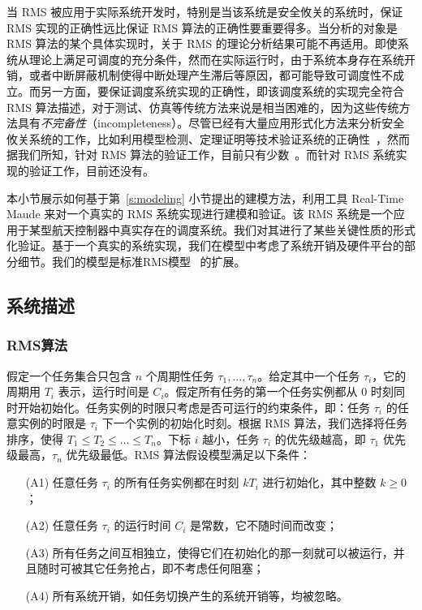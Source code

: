 当 RMS 被应用于实际系统开发时，特别是当该系统是安全攸关的系统时，保证 RMS 实现的正确性远比保证 RMS 算法的正确性要重要得多。当分析的对象是 RMS 算法的某个具体实现时，关于 RMS 的理论分析结果可能不再适用。即使系统从理论上满足可调度的充分条件，然而在实际运行时，由于系统本身存在系统开销，或者中断屏蔽机制使得中断处理产生滞后等原因，都可能导致可调度性不成立。而另一方面，要保证调度系统实现的正确性，即该调度系统的实现完全符合 RMS 算法描述，对于测试、仿真等传统方法来说是相当困难的，因为这些传统方法具有\emph{不完备性}（incompleteness）。尽管已经有大量应用形式化方法来分析安全攸关系统的工作，比如利用模型检测、定理证明等技术验证系统的正确性~\cite{DBLP:journals/tie/JiangZLDSGS15,DBLP:journals/iandc/MeseguerR13,DBLP:journals/cacm/Leroy09,DBLP:conf/sosp/KleinEHACDEEKNSTW09}，然而据我们所知，针对 RMS 算法的验证工作，目前只有少数~\cite{TianD2011,DBLP:conf/iceccs/CuiDT14}。而针对 RMS 系统实现的验证工作，目前还没有。

本小节展示如何基于第~\ref{s:modeling} 小节提出的建模方法，利用工具 Real-Time Maude 来对一个真实的 RMS 系统实现进行建模和验证。该 RMS 系统是一个应用于某型航天控制器中真实存在的调度系统。我们对其进行了某些关键性质的形式化验证。基于一个真实的系统实现，我们在模型中考虑了系统开销及硬件平台的部分细节。我们的模型是标准RMS模型~\cite{DBLP:journals/jacm/LiuL73} 的扩展。

\subsection{系统描述}
\label{s:background}

\subsubsection{RMS算法}
\label{ss:rms}

假定一个任务集合只包含 $n$ 个周期性任务 $\tau_1,\ldots,\tau_n$。给定其中一个任务 $\tau_i$，它的周期用 $T_i$ 表示，运行时间是 $C_i$。假定所有任务的第一个任务实例都从 $0$ 时刻同时开始初始化。任务实例的时限只考虑是否可运行的约束条件，即：任务 $\tau_i$ 的任意实例的时限是 $\tau_i$ 下一个实例的初始化时刻。根据 RMS 算法，我们选择将任务排序，使得 $T_1\le T_2\le \ldots \le T_n$。下标 $i$ 越小，任务 $\tau_i$ 的优先级越高，即 $\tau_1$ 优先级最高，$\tau_n$ 优先级最低。RMS 算法假设模型满足以下条件：
\begin{enumerate}
\item [(A1)] 任意任务 $\tau_i$ 的所有任务实例都在时刻 $kT_i$ 进行初始化，其中整数 $k\ge 0$；
\item [(A2)] 任意任务 $\tau_i$ 的运行时间 $C_i$ 是常数，它不随时间而改变；
\item [(A3)] 所有任务之间互相独立，使得它们在初始化的那一刻就可以被运行，并且随时可被其它任务抢占，即不考虑任何阻塞；
\item [(A4)] 所有系统开销，如任务切换产生的系统开销等，均被忽略。
\end{enumerate}

